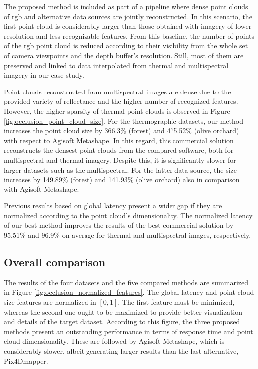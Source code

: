 The proposed method is included as part of a pipeline where dense point clouds of \acrshort{rgb} and alternative data sources are jointly reconstructed. In this scenario, the first point cloud is considerably larger than those obtained with imagery of lower resolution and less recognizable features. From this baseline, the number of points of the \acrshort{rgb} point cloud is reduced according to their visibility from the whole set of camera viewpoints and the depth buffer's resolution. Still, most of them are preserved and linked to data interpolated from thermal and multispectral imagery in our case study. 

Point clouds reconstructed from multispectral images are dense due to the provided variety of reflectance and the higher number of recognized features. However, the higher sparsity of thermal point clouds is observed in Figure \ref{fig:occlusion_point_cloud_size}. For the thermographic datasets, our method increases the point cloud size by 366.3\% (forest) and 475.52\% (olive orchard) with respect to Agisoft Metashape. In this regard, this commercial solution reconstructs the densest point clouds from the compared software, both for multispectral and thermal imagery. Despite this, it is significantly slower for larger datasets such as the multispectral. For the latter data source, the size increases by 149.89\% (forest) and 141.93\% (olive orchard) also in comparison with Agisoft Metashape.

Previous results based on global latency present a wider gap if they are normalized according to the point cloud's dimensionality. The normalized latency of our best method improves the results of the best commercial solution by 95.51\% and 96.9\% on average for thermal and multispectral images, respectively. 

\subsection{Overall comparison}

The results of the four datasets and the five compared methods are summarized in Figure \ref{fig:occlusion_normalized_features}. The global latency and point cloud size features are normalized in $[0, 1]$. The first feature must be minimized, whereas the second one ought to be maximized to provide better visualization and details of the target dataset. According to this figure, the three proposed methods present an outstanding performance in terms of response time and point cloud dimensionality. These are followed by Agisoft Metashape, which is considerably slower, albeit generating larger results than the last alternative, Pix4Dmapper.

